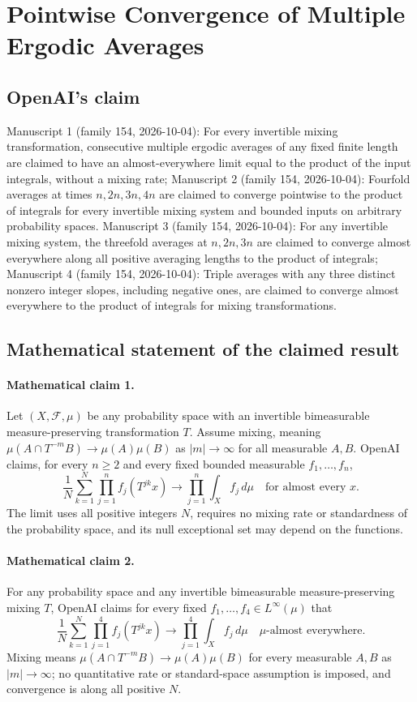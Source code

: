 \documentclass[11pt]{article}
\begin{document}
\section*{Pointwise Convergence of Multiple Ergodic Averages}

\subsection{OpenAI's claim}
Manuscript 1 (family 154, 2026-10-04): For every invertible mixing transformation, consecutive multiple ergodic averages of any fixed finite length are claimed to have an almost-everywhere limit equal to the product of the input integrals, without a mixing rate; Manuscript 2 (family 154, 2026-10-04): Fourfold averages at times $n,2n,3n,4n$ are claimed to converge pointwise to the product of integrals for every invertible mixing system and bounded inputs on arbitrary probability spaces. Manuscript 3 (family 154, 2026-10-04): For any invertible mixing system, the threefold averages at $n,2n,3n$ are claimed to converge almost everywhere along all positive averaging lengths to the product of integrals; Manuscript 4 (family 154, 2026-10-04): Triple averages with any three distinct nonzero integer slopes, including negative ones, are claimed to converge almost everywhere to the product of integrals for mixing transformations.

\subsection{Mathematical statement of the claimed result}
\paragraph{Mathematical claim 1.} Let $(X,\mathcal F,\mu)$ be any probability space with an invertible bimeasurable measure-preserving transformation $T$. Assume mixing, meaning $\mu(A\cap T^{-m}B)\to\mu(A)\mu(B)$ as $|m|\to\infty$ for all measurable $A,B$. OpenAI claims, for every $n\ge2$ and every fixed bounded measurable $f_1,\ldots,f_n$,
\[
\frac1N\sum_{k=1}^N\prod_{j=1}^n f_j(T^{jk}x)\longrightarrow\prod_{j=1}^n\int_X f_j\,d\mu
\quad\text{for almost every }x.
\]
The limit uses all positive integers $N$, requires no mixing rate or standardness of the probability space, and its null exceptional set may depend on the functions.

\paragraph{Mathematical claim 2.} For any probability space and any invertible bimeasurable measure-preserving mixing $T$, OpenAI claims for every fixed $f_1,\ldots,f_4\in L^\infty(\mu)$ that
\[
\frac1N\sum_{k=1}^N\prod_{j=1}^4 f_j(T^{jk}x)\longrightarrow\prod_{j=1}^4\int_X f_j\,d\mu
\quad\mu\text{-almost everywhere}.
\]
Mixing means $\mu(A\cap T^{-m}B)\to\mu(A)\mu(B)$ for every measurable $A,B$ as $|m|\to\infty$; no quantitative rate or standard-space assumption is imposed, and convergence is along all positive $N$.
\end{document}
